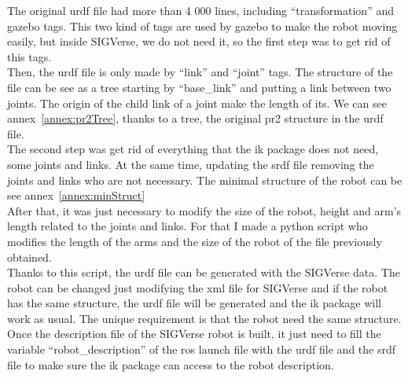 The original urdf file had more than 4 000 lines, including ``transformation'' and gazebo tags. This two kind of tags are used by gazebo to make the robot moving easily, but inside SIGVerse, we do not need it, so the first step was to get rid of this tags.\\
Then, the urdf file is only made by ``link'' and ``joint'' tags. The structure of the file can be see as a tree starting by ``base\_link'' and putting a link between two joints. The origin of the child link of a joint make the length of its. We can see annex~\ref{annex:pr2Tree}, thanks to a tree, the original pr2 structure in the urdf file. \\
The second step was get rid of everything that the ik package does not need, some joints and links. At the same time, updating the srdf file removing the joints and links who are not necessary. The minimal structure of the robot can be see annex~\ref{annex:minStruct} \\
After that, it was just necessary to modify the size of the robot, height and arm's length related to the joints and links. For that I made a python script who modifies the length of the arms and the size of the robot of the file previously obtained.\\
Thanks to this script, the urdf file can be generated with the SIGVerse data. The robot can be changed just modifying the xml file for SIGVerse and if the robot has the same structure, the urdf file will be generated and the ik package will work as usual. The unique requirement is that the robot need the same structure.\\ 

Once the description file of the SIGVerse robot is built, it just need to fill the variable ``robot\_description'' of the ros launch file with the urdf file and the srdf file to make sure the ik package can access to the robot description.\\

